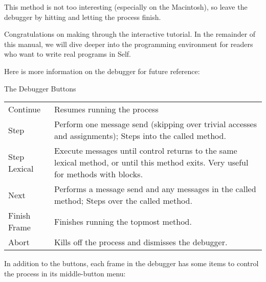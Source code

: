 \documentclass[letterpaper,10pt,english]{sphinxmanual}
\begin{document}

This method is not too interesting (especially on the Macintosh), so leave the debugger by hitting
 and letting the process finish.

Congratulations on making through the interactive tutorial. In the remainder of this manual, we
will dive deeper into the programming environment for readers who want to write real programs in
Self.

Here is more information on the debugger for future reference:


\begin{threeparttable}
\capstart\caption{The Debugger Buttons}\label{\detokenize{howtoprg:id15}}
\noindent\begin{tabulary}{\linewidth}{|L|L|}
\hline
{}\relax &\relax \\
\hline
Continue
&
Resumes running the process
\\
\hline
Step
&
Perform one message send (skipping over trivial accesses and assignments); Steps into the called method.
\\
\hline
Step Lexical
&
Execute messages until control returns to the same lexical method, or until this method exits. Very useful for methods with blocks.
\\
\hline
Next
&
Performs a message send and any messages in the called method; Steps over the called method.
\\
\hline
Finish Frame
&
Finishes running the topmost method.
\\
\hline
Abort
&
Kills off the process and dismisses the debugger.
\\
\hline\end{tabulary}

\end{threeparttable}


In addition to the buttons, each frame in the debugger has some items to control the process in its
middle-button menu:
\end{document}
